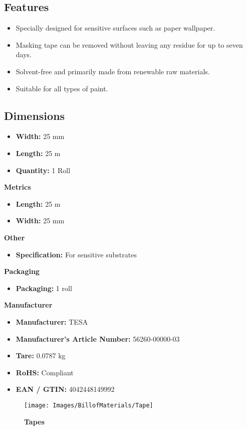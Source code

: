 \subsection{Features}
\begin{itemize}[noitemsep]
	\item Specially designed for sensitive surfaces such as paper wallpaper.
	\item Masking tape can be removed without leaving any residue for up to seven days.
	\item Solvent-free and primarily made from renewable raw materials.
	\item Suitable for all types of paint.
\end{itemize}

\subsection{Dimensions}
\begin{itemize}[noitemsep]
	\item \textbf{Width:} 25 mm
	\item \textbf{Length:} 25 m
	\item \textbf{Quantity:} 1 Roll
\end{itemize}

\textbf{Metrics}
\begin{itemize}[noitemsep]
	\item \textbf{Length:} 25 m
	\item \textbf{Width:} 25 mm
\end{itemize}

\textbf{Other}
\begin{itemize}[noitemsep]
	\item \textbf{Specification:} For sensitive substrates
\end{itemize}

\textbf{Packaging}
\begin{itemize}[noitemsep]
	\item \textbf{Packaging:} 1 roll
\end{itemize}

\textbf{Manufacturer}
\begin{itemize}[noitemsep]
	\item \textbf{Manufacturer:} TESA
	\item \textbf{Manufacturer's Article Number:} 56260-00000-03
	\item \textbf{Tare:} 0.0787 kg
	\item \textbf{RoHS:} Compliant
	\item \textbf{EAN / GTIN:} 4042448149992
\end{itemize}


\begin{figure}[h!]\centering
	\texttt{[image: Images/BillofMaterials/Tape]}
	\caption{\textbf{Tapes}}
	\label{fig:Tape}
\end{figure}
